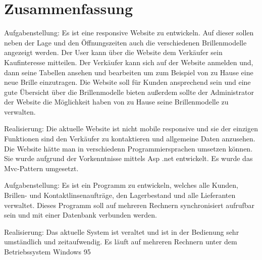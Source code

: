 \chapter{Zusammenfassung}
Aufgabenstellung:
Es ist eine responsive Website zu entwickeln. Auf dieser sollen neben der Lage und den Öffnungszeiten auch die verschiedenen Brillenmodelle angezeigt werden. Der User kann über die Website dem Verkäufer sein Kaufinteresse mitteilen. Der Verkäufer kann sich auf der Website anmelden und, dann seine Tabellen ansehen und bearbeiten um zum Beispiel von zu Hause eine neue Brille einzutragen.
Die Website soll für Kunden ansprechend sein und eine gute Übersicht über die Brillenmodelle bieten außerdem sollte der Administrator der Website die Möglichkeit haben von zu Hause seine Brillenmodelle zu verwalten.

Realisierung:
Die aktuelle Website ist nicht mobile responsive und sie der einzigen Funktionen sind den Verkäufer zu kontaktieren und allgemeine Daten anzusehen.
Die Website hätte man in verschiedenn Programmiersprachen umsetzen können.
Sie wurde aufgrund der Vorkenntnisse mittels Asp .net entwickelt. Es wurde das Mvc-Pattern umgesetzt.



Aufgabenstellung:
Es ist ein Programm zu entwickeln, welches alle Kunden, Brillen- und Kontaktlinsenaufträge, den Lagerbestand und alle Lieferanten verwaltet. Dieses Programm soll auf mehreren Rechnern synchronisiert aufrufbar sein und mit einer Datenbank verbunden werden.

Realisierung:
Das aktuelle System ist veraltet und ist in der Bedienung sehr umständlich und zeitaufwendig. Es läuft auf mehreren Rechnern unter dem Betriebssystem Windows 95